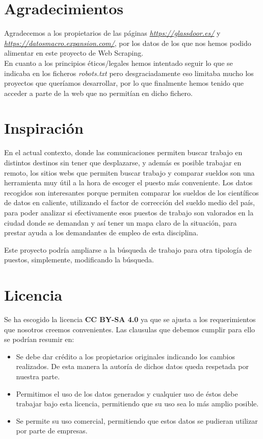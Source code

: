 \documentclass[IB]{PlantillaPACnova_Est}
\begin{document}
\section{Agradecimientos}

Agradecemos a los propietarios de las páginas  \textit{\url{https://glassdoor.es/}} y \textit{ \url{https://datosmacro.expansion.com/}}, por los datos de los que nos hemos podido alimentar en este proyecto de Web Scraping. \\

En cuanto a los principios éticos/legales hemos intentado seguir lo que se indicaba en los ficheros \textit{robots.txt} pero desgraciadamente eso limitaba mucho los proyectos que queríamos desarrollar, por lo que finalmente hemos tenido que acceder a parte de la web que no permitían en dicho fichero.

\section{Inspiración}

En el actual contexto, donde las comunicaciones permiten buscar trabajo en distintos destinos sin tener que desplazarse, y además es posible trabajar en remoto, los sitios webs que permiten buscar trabajo y comparar sueldos son una herramienta muy útil a la hora de escoger el puesto más conveniente. Los datos recogidos son interesantes porque permiten comparar los sueldos de los científicos de datos en caliente, utilizando el factor de corrección del sueldo medio del país, para poder analizar si efectivamente esos puestos de trabajo son valorados en la ciudad donde se demandan y así tener un mapa claro de la situación, para prestar ayuda a los demandantes de empleo de esta disciplina. 

Este proyecto podría ampliarse a la búsqueda de trabajo para otra tipología de puestos, simplemente, modificando la búsqueda.

\newpage 
\section{Licencia}
Se ha escogido la licencia \textbf{CC BY-SA 4.0} ya que se ajusta a los requerimientos que nosotros creemos convenientes. Las clausulas que debemos cumplir para ello se podrían resumir en:

\begin{itemize}
\item Se debe dar crédito a los propietarios originales indicando los cambios realizados. De esta manera la autoría de dichos datos queda respetada por nuestra parte.
\item Permitimos el uso de los datos generados y cualquier uso de éstos debe trabajar bajo esta licencia, permitiendo que su uso sea lo más amplio posible.
\item Se permite su uso comercial, permitiendo que estos datos se pudieran utilizar por parte de empresas.

\end{itemize}
\end{document}
